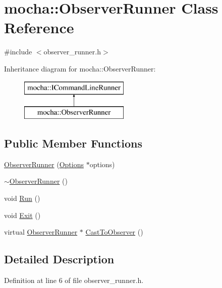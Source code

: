 \hypertarget{classmocha_1_1_observer_runner}{
\section{mocha::ObserverRunner Class Reference}
\label{classmocha_1_1_observer_runner}
}


{\ttfamily \#include $<$observer\_\-runner.h$>$}

Inheritance diagram for mocha::ObserverRunner:\begin{figure}[H]
\begin{center}
\leavevmode
\includegraphics[height=2.000000cm]{classmocha_1_1_observer_runner}
\end{center}
\end{figure}
\subsection*{Public Member Functions}
\begin{DoxyCompactItemize}
\item 
\hyperlink{classmocha_1_1_observer_runner_a240d870df8cb79f905c42bd79e64785e}{ObserverRunner} (\hyperlink{classmocha_1_1_options}{Options} $\ast$options)
\item 
\hyperlink{classmocha_1_1_observer_runner_a1ed49ca066efe99694e1126b8d8f367d}{$\sim$ObserverRunner} ()
\item 
void \hyperlink{classmocha_1_1_observer_runner_a663c9c34fee480c6da98e2c3f1d49470}{Run} ()
\item 
void \hyperlink{classmocha_1_1_observer_runner_ae732ac2212449571630a6e1814dc2c5d}{Exit} ()
\item 
virtual \hyperlink{classmocha_1_1_observer_runner}{ObserverRunner} $\ast$ \hyperlink{classmocha_1_1_observer_runner_aa0727a0b624754d18bba15f1accf365a}{CastToObserver} ()
\end{DoxyCompactItemize}


\subsection{Detailed Description}


Definition at line 6 of file observer\_\-runner.h.



